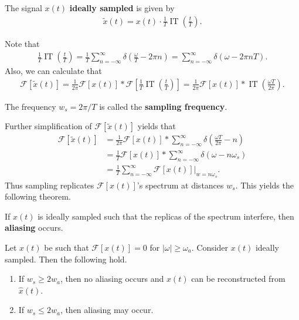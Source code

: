 \documentclass{memoir}
\newcommand{\IT}{\operatorname{IT}}
\newcommand{\F}{\mathcal{F}}
\begin{document}
\begin{definition}
    The signal $x(t)$ \textbf{ideally sampled} is given by
    \begin{align*}
        \tilde{x}(t) = x(t) \cdot \frac{1}{T}\IT\left(\frac{t}{T}\right).
    \end{align*}
\end{definition}
Note that
\begin{align*}
    \frac{1}{T}\IT\left(\frac{t}{T}\right) = \frac{1}{T} \sum_{n=-\infty}^{\infty}\delta\left(\frac{\omega}{T} - 2 \pi n\right) = \sum_{n=-\infty}^{\infty} \delta(\omega - 2 \pi n T).
\end{align*}
Also, we can calculate that
\begin{align*}
    \F[\tilde{x}(t)] = \frac{1}{2 \pi} \F[x(t)] \ast \F\left[\frac{1}{T}\IT\left(\frac{t}{T}\right)\right] = \frac{1}{2 \pi} \F[x(t)] \ast \IT\left(\frac{\omega T}{2 \pi}\right).
\end{align*}
\begin{definition}
    The frequency $w_s = 2 \pi / T$ is called the \textbf{sampling frequency}.
\end{definition}
Further simplification of $\F[\tilde{x}(t)]$ yields that
\begin{align*}
    \F[\tilde{x}(t)] &= \frac{1}{2 \pi} \F[x(t)] \ast \sum_{n=-\infty}^{\infty} \delta\left(\frac{\omega T}{2\pi} - n\right) \\
    &= \frac{1}{T} \F[x(t)] \ast \sum_{n=-\infty}^{\infty} \delta( \omega - n \omega_s) \\
    &= \frac{1}{T} \sum_{n=-\infty}^{\infty} \left.\F[x(t)]\right|_{w=n \omega_s}.
\end{align*}
Thus sampling replicates $\F[x(t)]$'s spectrum at distances $w_s$. This yields the following theorem.
\begin{definition}
    If $x(t)$ is ideally sampled such that the replicas of the spectrum interfere, then \textbf{aliasing} occurs.
\end{definition}
\begin{theorem}
    Let $x(t)$ be such that $\F[x(t)] = 0$ for $|\omega| \ge \omega_a$. Consider $x(t)$ ideally sampled. Then the following hold.
    \begin{enumerate}
        \item If $w_s \ge 2 w_a$, then no aliasing occurs and $x(t)$ can be reconstructed from $\hat{x}(t)$.
        \item If $w_s \le 2 w_a$, then aliasing may occur.
    \end{enumerate}
\end{theorem}
\end{document}
